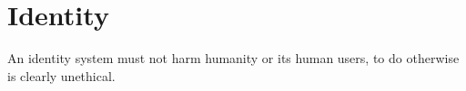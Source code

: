 
\section{Identity}












An identity system must not harm humanity or its human users, to do otherwise is clearly unethical.  

